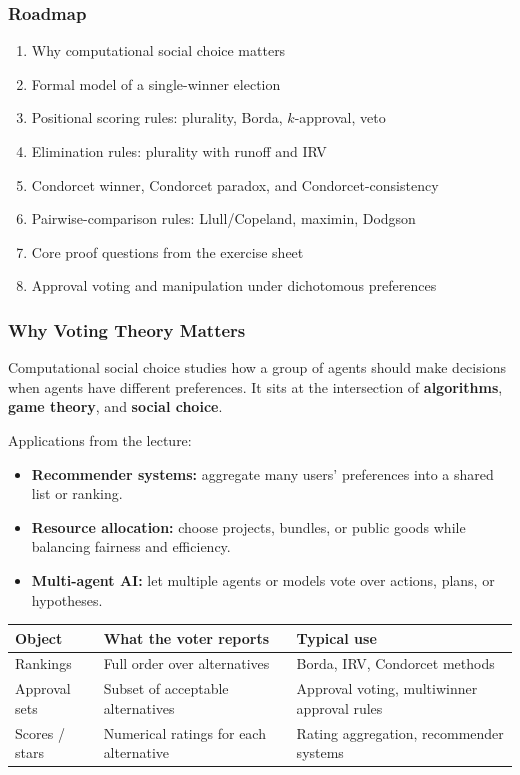 \subsubsection*{Roadmap}
\begin{enumerate}
  \item Why computational social choice matters
  \item Formal model of a single-winner election
  \item Positional scoring rules: plurality, Borda, $k$-approval, veto
  \item Elimination rules: plurality with runoff and IRV
  \item Condorcet winner, Condorcet paradox, and Condorcet-consistency
  \item Pairwise-comparison rules: Llull/Copeland, maximin, Dodgson
  \item Core proof questions from the exercise sheet
  \item Approval voting and manipulation under dichotomous preferences
\end{enumerate}

\bigseparator

\subsubsection{Why Voting Theory Matters}

\begin{defbox}
Computational social choice studies how a group of agents should make decisions when agents have different preferences. It sits at the intersection of \textbf{algorithms}, \textbf{game theory}, and \textbf{social choice}.
\end{defbox}

Applications from the lecture:
\begin{itemize}
  \item \textbf{Recommender systems:} aggregate many users' preferences into a shared list or ranking.
  \item \textbf{Resource allocation:} choose projects, bundles, or public goods while balancing fairness and efficiency.
  \item \textbf{Multi-agent AI:} let multiple agents or models vote over actions, plans, or hypotheses.
\end{itemize}

\begin{center}
\renewcommand{\arraystretch}{1.25}
\begin{tabular}{@{}p{2.8cm}p{4.4cm}p{5.1cm}@{}}
\toprule
\textbf{Object} & \textbf{What the voter reports} & \textbf{Typical use} \\
\midrule
Rankings & Full order over alternatives & Borda, IRV, Condorcet methods \\
Approval sets & Subset of acceptable alternatives & Approval voting, multiwinner approval rules \\
Scores / stars & Numerical ratings for each alternative & Rating aggregation, recommender systems \\
\bottomrule
\end{tabular}
\end{center}

